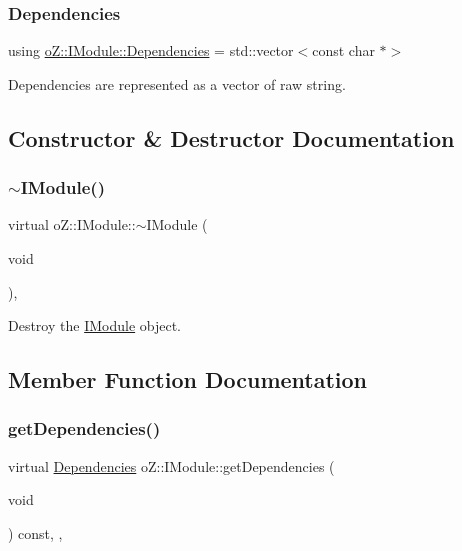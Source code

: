 \subsubsection{\texorpdfstring{Dependencies}{Dependencies}}
{\footnotesize\ttfamily using \mbox{\hyperlink{classo_z_1_1_i_module_ac13210556cb2a65d186bfbe5208c666c}{o\+Z\+::\+I\+Module\+::\+Dependencies}} =  std\+::vector$<$const char $\ast$$>$}



Dependencies are represented as a vector of raw string. 



\subsection{Constructor \& Destructor Documentation}
\mbox{\label{classo_z_1_1_i_module_a6ac6f3edf9fe885b2510dc01379a951c}} 
\subsubsection{\texorpdfstring{$\sim$IModule()}{~IModule()}}
{\footnotesize\ttfamily virtual o\+Z\+::\+I\+Module\+::$\sim$\+I\+Module (\begin{DoxyParamCaption}\item[{void}]{ }\end{DoxyParamCaption})\hspace{0.3cm}{\ttfamily [virtual]}, {\ttfamily [default]}}



Destroy the \mbox{\hyperlink{classo_z_1_1_i_module}{I\+Module}} object. 



\subsection{Member Function Documentation}
\mbox{\label{classo_z_1_1_i_module_a720a329e6ebcbecbc150d8b0bbee6e37}} 
\subsubsection{\texorpdfstring{getDependencies()}{getDependencies()}}
{\footnotesize\ttfamily virtual \mbox{\hyperlink{classo_z_1_1_i_module_ac13210556cb2a65d186bfbe5208c666c}{Dependencies}} o\+Z\+::\+I\+Module\+::get\+Dependencies (\begin{DoxyParamCaption}\item[{void}]{ }\end{DoxyParamCaption}) const\hspace{0.3cm}{\ttfamily [inline]}, {\ttfamily [virtual]}, {\ttfamily [noexcept]}}



